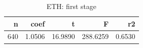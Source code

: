 \begin{table}
\caption{ETH: first stage}
\label{tab:t7_first_stage_ETH}
\begin{tabular}{rrrrr}
\toprule
n & coef & t & F & r2 \\
\midrule
640 & 1.0506 & 16.9890 & 288.6259 & 0.6530 \\
\bottomrule
\end{tabular}
\end{table}
